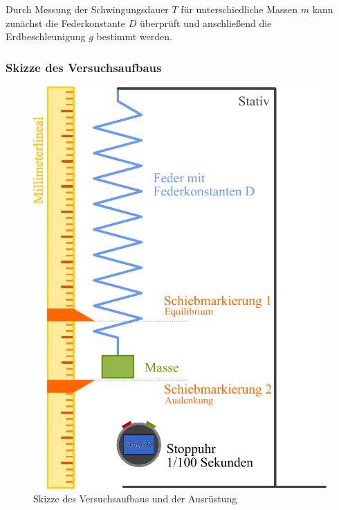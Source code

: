 Durch Messung der Schwingungsdauer $T$ für unterschiedliche Massen $m$ kann zunächst die Federkonstante $D$ überprüft und anschließend die Erdbeschleunigung $g$ bestimmt werden. 

\subsubsection*{Skizze des Versuchsaufbaus}
\begin{figure}[h!]
    \centering
    \includegraphics[width=\columnwidth]{img/11/Versuchsaufbau.pdf}
    \caption{Skizze des Versuchsaufbaus \newline und der Ausrüstung}
    \label{fig:versuchsaufbau}
\end{figure}

